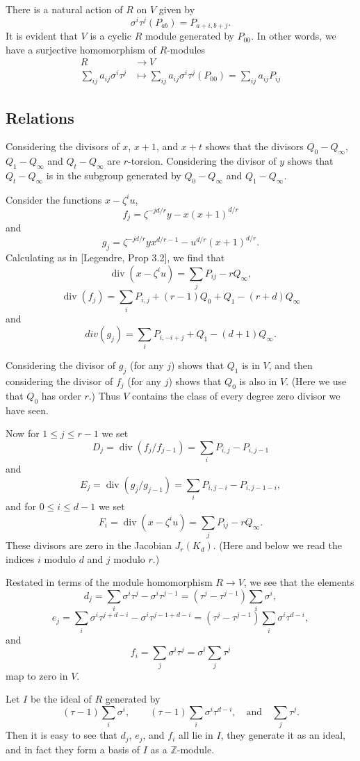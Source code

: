 \documentclass[reqno]{amsart}
\theoremstyle{definition}
\theoremstyle{remark}
\DeclareMathOperator{\dvsr}{div}
\def\Z{\mathbb{Z}}
\begin{document}
There is a natural action of $R$ on $V$ given by 
$$\sigma^i\tau^j(P_{ab})=P_{a+i,b+j}.$$
It is evident that $V$ is a cyclic $R$ module generated by $P_{00}$.
In other words, we have a surjective homomorphism of $R$-modules
\begin{align*}
R&\to V\\
\sum_{ij}a_{ij}\sigma^i\tau^j&\mapsto
\sum_{ij}a_{ij}\sigma^i\tau^j(P_{00})
=\sum_{ij}a_{ij} P_{ij}
\end{align*}


\subsection{Relations}
Considering the divisors of $x$, $x+1$, and $x+t$ shows that the
divisors $Q_0-Q_\infty$, $Q_1-Q_\infty$ and $Q_t-Q_\infty$ are
$r$-torsion.  Considering the divisor of $y$ shows that $Q_t-Q_\infty$ is in
the subgroup generated by $Q_0-Q_\infty$ and $Q_1-Q_\infty$.  

Consider the functions $x-\zeta^iu$, 
$$f_j=\zeta^{-jd/r}y-x(x+1)^{d/r}$$
and 
$$g_j=\zeta^{-jd/r}yx^{d/r-1}-u^{d/r}(x+1)^{d/r}.$$
Calculating as in [Legendre, Prop 3.2], we find that
$$\dvsr(x-\zeta^iu)=\sum_j P_{ij}-rQ_\infty,$$
$$\dvsr(f_j)=\sum_iP_{i,j}+(r-1)Q_0+Q_1-(r+d)Q_\infty$$
and
$$div(g_j)=\sum_iP_{i,-i+j}+Q_1-(d+1)Q_\infty.$$

Considering the divisor of $g_j$ (for any $j$) shows that $Q_1$ is in
$V$, and then considering the divisor of $f_j$ (for any $j$) shows
that $Q_0$ is also in $V$.  (Here we use that $Q_0$ has order $r$.)  
Thus $V$ contains the class of every degree zero divisor we have
seen.

Now for $1\le j\le r-1$ we set
$$D_j=\dvsr(f_j/f_{j-1})=\sum_i P_{i,j}-P_{i,j-1}$$
and
$$E_j=\dvsr(g_j/g_{j-1})=\sum_i P_{i,j-i}-P_{i,j-1-i},$$
and for $0\le i\le d-1$ we set
$$F_i=\dvsr(x-\zeta^iu)=\sum_j P_{ij}-rQ_\infty.$$
These divisors are zero in the Jacobian $J_r(K_d)$.  (Here and below
we read the indices $i$ modulo $d$ and $j$ modulo $r$.)

Restated in terms of the module homomorphism $R\to V$, we see that the
elements 
$$d_j=\sum_i \sigma^i\tau^j-\sigma^i\tau^{j-1}
=(\tau^j-\tau^{j-1})\sum_i \sigma^i,$$
$$e_j=\sum_i \sigma^i\tau^{j+d-i}-\sigma^i\tau^{j-1+d-i}=
( \tau^{j}-\tau^{j-1})\sum_i\sigma^i\tau^{d-i},$$
and
$$f_i=\sum_j \sigma^i\tau^j=\sigma^i\sum_j\tau^j$$
map to zero in $V$.

Let $I$ be the ideal of $R$ generated by
$$(\tau-1)\sum_i \sigma^i,\qquad
(\tau-1)\sum_i\sigma^i\tau^{d-i}, \quad\text{and}\quad \sum_j\tau^j.$$
Then it is easy to see that $d_j$, $e_j$, and $f_i$ all lie in $I$,
they generate it as an ideal, and in fact they form a basis of $I$ as
a $\Z$-module.
\end{document}
